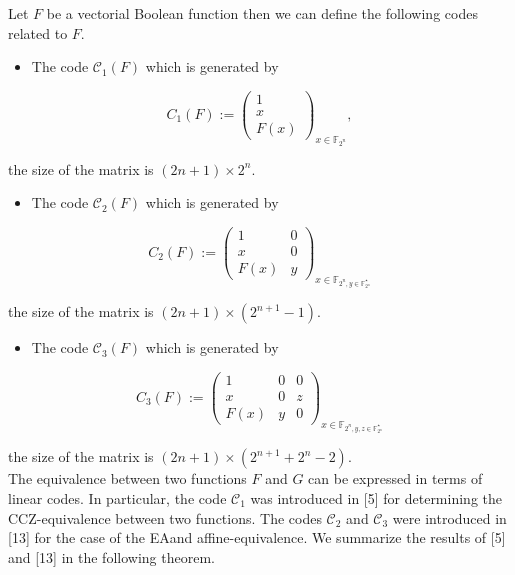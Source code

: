 \documentclass[10pt]{article}
\begin{document}
Let $F$ be a vectorial Boolean function then we can define the following codes related to $F$.

\begin{itemize}
  \item The code $\mathscr{C}_{1}(F)$ which is generated by
\end{itemize}

$$
C_{1}(F):=\left(\begin{array}{c}
1 \\
x \\
F(x)
\end{array}\right)_{x \in \mathbb{F}_{2^{n}}},
$$

the size of the matrix is $(2 n+1) \times 2^{n}$.

\begin{itemize}
  \item The code $\mathscr{C}_{2}(F)$ which is generated by
\end{itemize}

$$
C_{2}(F):=\left(\begin{array}{cc}
1 & 0 \\
x & 0 \\
F(x) & y
\end{array}\right)_{x \in \mathbb{F}_{2^{n}, y \in \mathbb{F}_{2^{n}}^{\star}}}
$$

the size of the matrix is $(2 n+1) \times\left(2^{n+1}-1\right)$.

\begin{itemize}
  \item The code $\mathscr{C}_{3}(F)$ which is generated by
\end{itemize}

$$
C_{3}(F):=\left(\begin{array}{ccc}
1 & 0 & 0 \\
x & 0 & z \\
F(x) & y & 0
\end{array}\right)_{x \in \mathbb{F}_{2^{n}, y, z \in \mathbb{F}_{2^{n}}^{\star}}}
$$

the size of the matrix is $(2 n+1) \times\left(2^{n+1}+2^{n}-2\right)$.\\
The equivalence between two functions $F$ and $G$ can be expressed in terms of linear codes. In particular, the code $\mathscr{C}_{1}$ was introduced in [5] for determining the CCZ-equivalence between two functions. The codes $\mathscr{C}_{2}$ and $\mathscr{C}_{3}$ were introduced in [13] for the case of the EAand affine-equivalence. We summarize the results of [5] and [13] in the following theorem.
\end{document}
